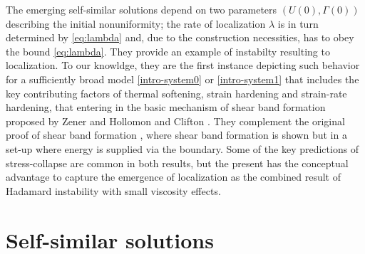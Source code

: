 \documentclass[a4paper,11pt]{article}
\theoremstyle{remark}
\begin{document}
The emerging self-similar solutions depend on two parameters $(U(0), \Gamma (0))$ describing the initial nonuniformity; the rate of localization $\lambda$ is 
in turn determined by \eqref{eq:lambda} and, due to the construction necessities, has to obey the bound \eqref{eq:lambda}.
They provide an example of instabilty resulting to localization. To our knowldge, they are the first instance depicting such behavior for
a sufficiently broad model \eqref{intro-system0} or \eqref{intro-system1} that includes the key contributing factors 
of thermal softening, strain hardening and strain-rate hardening, that entering in the 
basic mechanism of shear band formation proposed by Zener and Hollomon \cite{zener_effect_1944} and Clifton \cite{clifton_rev_1990}. 
They complement the original proof of shear band formation \cite{Tz_1987}, where shear band formation is shown but in a set-up where energy is supplied via the boundary. 
Some of the key predictions of stress-collapse are common in both results, but the present has the conceptual 
advantage to capture the emergence of localization as the combined result
of Hadamard instability with small viscosity effects.





\vfil\eject

\section{Self-similar solutions} \label{sec:scale}
\end{document}
